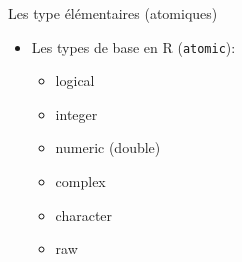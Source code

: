 \documentclass[
  ignorenonframetext,
]{beamer}
\providecommand{\tightlist}{%
  \setlength{\itemsep}{0pt}\setlength{\parskip}{0pt}}
\begin{document}
\begin{frame}[fragile]{Les type élémentaires (atomiques)}
\protect\hypertarget{les-type-uxe9luxe9mentaires-atomiques}{}
\begin{itemize}
\tightlist
\item
  Les types de base en R (\texttt{atomic}):

  \begin{itemize}
  \tightlist
  \item
    logical
  \item
    integer
  \item
    numeric (double)
  \item
    complex
  \item
    character
  \item
    raw
  \end{itemize}
\end{itemize}
\end{frame}
\end{document}
